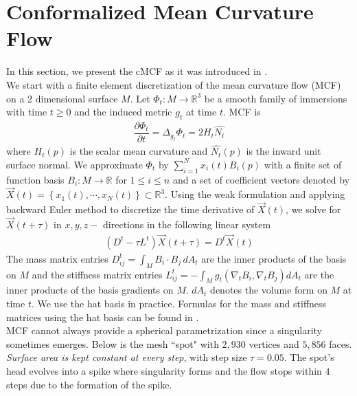 \documentclass[11pt]{amsart}
\begin{document}
\section{Conformalized Mean Curvature Flow} 
In this section, we present the cMCF as it was introduced in \cite{ksbc}. \\
We start with a finite element discretization of the mean curvature flow (MCF) on a 2 dimensional surface $M$. Let $\Phi_t \colon M \rightarrow \mathbb{R}^3$ be a smooth family of immersions with time $t \geq 0$ and the induced metric $g_t$ at time $t$. MCF is
\begin{align} 
\dfrac{\partial \Phi_t}{\partial t} = \varDelta_{g_t} \Phi_t =  2H_t \hat{N_{t}}
\end{align}
where $H_t(p)$ is the scalar mean curvature and $\hat{N_t} (p)$ is the inward unit surface normal. We approximate $\Phi_t$ by $\sum_{i=1}^{N} x_i(t) B_i(p)$ with a finite set of function basis $B_i \colon M \rightarrow \mathbb{R}$ for $1 \leq i \leq n$ and a set of coefficient vectors denoted by $ \vec{X}(t) = \left\{ x_1(t), \cdots, x_N(t) \right\} \subset \mathbb{R}^3$. Using the weak formulation and applying backward Euler method to discretize the time derivative of $\vec{X}(t)$, we solve for $\vec{X}(t+ \tau)$ in $x,y,z-$ directions in the following linear system 
\begin{align}
 (D^t - \tau L^t) \vec{X}(t+\tau) = D^t \vec{X}(t)
\end{align}
The mass matrix entries $D^t_{ij} = \int_M B_i \cdot B_j \, dA_t$ are the inner products of the basis on $M$ and the stiffness matrix entries $L^t_{ij} =  - \int_M g_t(\nabla_{t}B_i, \nabla_{t} B_j ) dA_t$ are the inner products of the basis gradients on $M$. $dA_t$ denotes the volume form on $M$ at time $t$. We use the hat basis in practice. Formulas for the mass and stiffness matrices using the hat basis can be found in \cite{ksbc}.\\
MCF cannot always provide a spherical parametrization since a singularity sometimes emerges. Below is the mesh ``spot" with $2,930$ vertices and $5,856$ faces. \textit{Surface area is kept constant at every step}, with step size $ \tau =0.05$. The spot's head evolves into a spike where singularity forms and the flow stops within $4$ steps due to the formation of the spike.
\end{document}
